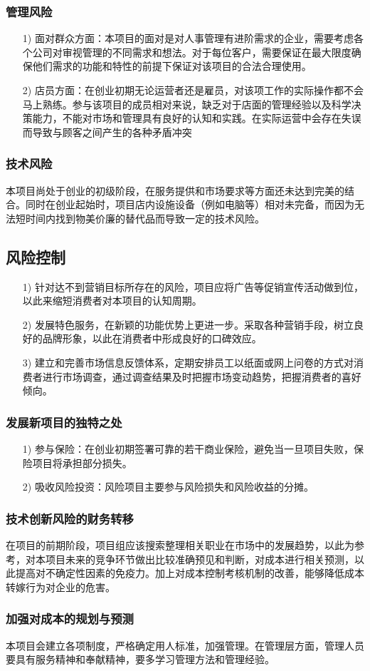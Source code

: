 \documentclass[a4,UTF8]{ctexart}
\begin{document}
\subsubsection{管理风险}
\begin{itemize}
\item[1)]面对群众方面：本项目的面对是对人事管理有进阶需求的企业，需要考虑各个公司对审视管理的不同需求和想法。对于每位客户，需要保证在最大限度确保他们需求的功能和特性的前提下保证对该项目的合法合理使用。

\item[2)]店员方面：在创业初期无论运营者还是雇员，对该项工作的实际操作都不会马上熟练。参与该项目的成员相对来说，缺乏对于店面的管理经验以及科学决策能力，不能对市场和管理具有良好的认知和实践。在实际运营中会存在失误而导致与顾客之间产生的各种矛盾冲突
\end{itemize}
\subsubsection{技术风险}
本项目尚处于创业的初级阶段，在服务提供和市场要求等方面还未达到完美的结合。同时在创业起始时，项目店内设施设备（例如电脑等）相对未完备，而因为无法短时间内找到物美价廉的替代品而导致一定的技术风险。
\subsection{风险控制}
\begin{itemize}
\item[1)]针对达不到营销目标所存在的风险，项目应将广告等促销宣传活动做到位，以此来缩短消费者对本项目的认知周期。


\item[2)]发展特色服务，在新颖的功能优势上更进一步。采取各种营销手段，树立良好的品牌形象，以此在消费者中形成良好的口碑效应。


\item[3)]建立和完善市场信息反馈体系，定期安排员工以纸面或网上问卷的方式对消费者进行市场调查，通过调查结果及时把握市场变动趋势，把握消费者的喜好倾向。
\end{itemize}
\subsubsection{发展新项目的独特之处}
\begin{itemize}
\item[1)]参与保险：在创业初期签署可靠的若干商业保险，避免当一旦项目失败，保险项目将承担部分损失。 
\item[2)]吸收风险投资：风险项目主要参与风险损失和风险收益的分摊。
\end{itemize}
\subsubsection{技术创新风险的财务转移}
在项目的前期阶段，项目组应该搜索整理相关职业在市场中的发展趋势，以此为参考，对本项目未来的竞争环节做出比较准确预见和判断，对成本进行相关预测，以此提高对不确定性因素的免疫力。加上对成本控制考核机制的改善，能够降低成本转嫁行为对企业的危害。
\subsubsection{加强对成本的规划与预测}
本项目会建立各项制度，严格确定用人标准，加强管理。在管理层方面，管理人员要具有服务精神和奉献精神，要多学习管理方法和管理经验。
\end{document}
